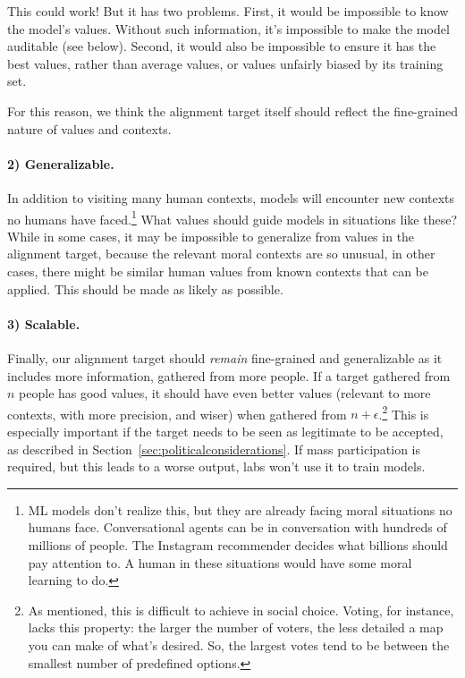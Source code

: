 \documentclass{article}
\theoremstyle{definition}
\begin{document}
This could work! But it has two problems. First, it would be impossible to know the model’s values. Without such information, it’s impossible to make the model auditable (see below). Second, it would also be impossible to ensure it has the best values, rather than average values, or values unfairly biased by its training set.

For this reason, we think the alignment target itself should reflect the fine-grained nature of values and contexts.

\paragraph{2) Generalizable.} In addition to visiting many human contexts, models will encounter new contexts no humans have faced.\footnote{ML models don't realize this, but they are already facing moral situations no humans face. Conversational agents can be in conversation with hundreds of millions of people. The Instagram recommender decides what billions should pay attention to. A human in these situations would have some moral learning to do.} What values should guide models in situations like these? While in some cases, it may be impossible to generalize from values in the alignment target, because the relevant moral contexts are so unusual, in other cases, there might be similar human values from known contexts that can be applied. This should be made as likely as possible.

\paragraph{3) Scalable.} Finally, our alignment target should \textit{remain} fine-grained and generalizable as it includes more information, gathered from more people. If a target gathered from $n$ people has good values, it should have even better values (relevant to more contexts, with more precision, and wiser) when gathered from $n+\epsilon$.\footnote{As mentioned, this is difficult to achieve in social choice. Voting, for instance, lacks this property: the larger the number of voters, the less detailed a map you can make of what’s desired. So, the largest votes tend to be between the smallest number of predefined options.} This is especially important if the target needs to be seen as legitimate to be accepted, as described in Section~\ref{sec:politicalconsiderations}. If mass participation is required, but this leads to a worse output, labs won't use it to train models.
\end{document}
